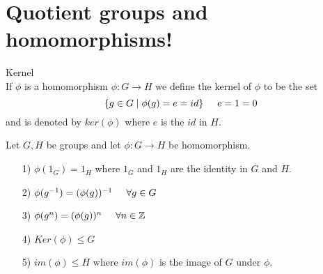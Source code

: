 \documentclass{article}
\begin{document}
\section*{Quotient groups and homomorphisms!}

 Kernel\\
If \(\phi\) is a homomorphism \(\phi : G \xrightarrow{}H\) we define the kernel of \(\phi\) to be the set
\[\{g \in G \mid \phi (g)=e=id\} \hspace{0.5cm} e=1=0\]
and is denoted by \(ker(\phi)\) where \(e\) is the \(id\) in \(H\).

\vspace{0.5cm}
Let \(G,H\) be groups and let \(\phi : G \xrightarrow{}H\) be homomorphism.
\begin{enumerate}
    \item[1)] \(\phi(1_G)=1_H\) where \(1_G\) and \(1_H\) are the identity in \(G\) and \(H\).
    \item[2)] \(\phi(g^{-1})=(\phi(g))^{-1} \hspace{0.5cm} \forall g \in G\)
    \item[3)] \(\phi(g^n)=(\phi(g))^n \hspace{0.5cm} \forall n \in \mathbb{Z}\)
    \item[4)]  \(Ker(\phi) \leq G\)
    \item[5)] \(im(\phi) \leq H\) where \(im(\phi)\) is the image of \(G\) under \(\phi\).
\end{enumerate}
\end{document}
